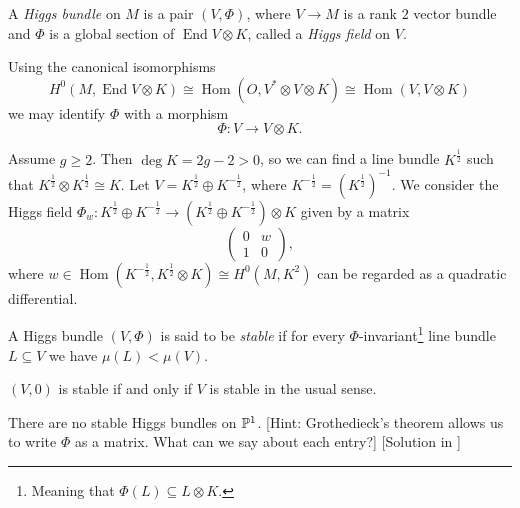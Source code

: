 \documentclass[A4paper, 12pt, british, reqno]{amsart}
\DeclareMathOperator{\Hom}{Hom}
\DeclareMathOperator{\End}{End}
\newcommand{\ot}{\otimes}
\newcommand{\op}{\oplus}
\newcommand{\dual}{^{*}}
\begin{document}
\begin{defn}
    A \textit{Higgs bundle} on $M$ is a pair $(V,\Phi)$, where $V\to M$ is a rank $2$ vector bundle and $\Phi$ is a global section of $\End{V}\ot K$, called a \textit{Higgs field} on $V$.
\end{defn}

\begin{rem}
    Using the canonical isomorphisms
    \[ H^{0}(M,\End{V}\ot K)\cong \Hom(O,V\dual \ot V\ot K)\cong \Hom(V,V\ot K) \]
    we may identify $\Phi$ with a morphism
    \[ \Phi\colon V\to V\ot K. \]
\end{rem}


\begin{exa}
    Assume $g\geqslant 2$.
    Then $\deg{K}=2g-2>0$, so we can find a line bundle $K^{\frac{1}{2}}$ such that $K^{\frac{1}{2}}\ot K^{\frac{1}{2}}\cong K$.
    Let $V=K^{\frac{1}{2}}\op K^{-\frac{1}{2}}$, where $K^{-\frac{1}{2}}=(K^{\frac{1}{2}})^{-1}$.
    We consider the Higgs field $\Phi_{w}\colon K^{\frac{1}{2}}\op K^{-\frac{1}{2}}\to (K^{\frac{1}{2}}\op K^{-\frac{1}{2}})\ot K$ given by a matrix
    \[
	\begin{pmatrix}
	    0 & w \\
	    1 & 0
	\end{pmatrix},
    \]
    where $w\in \Hom(K^{-\frac{1}{2}},K^{\frac{1}{2}}\ot K)\cong H^{0}(M,K^{2})$ can be regarded as a quadratic differential.
\end{exa}

\begin{defn}[Stability]
A Higgs bundle $(V,\Phi)$ is said to be \textit{stable} if for every $\Phi$-invariant\footnote{Meaning that $\Phi(L)\subseteq L\ot K$.} line bundle $L\subseteq V$ we have $\mu(L)<\mu(V)$.
\end{defn}

\begin{rem}
    $(V,0)$ is stable if and only if $V$ is stable in the usual sense.
\end{rem}

\begin{exe}
    There are no stable Higgs bundles on $\P^{1}$.
    [Hint: Grothedieck's theorem allows us to write $\Phi$ as a matrix. What can we say about each entry?]
    [Solution in \cite{hit87a}]
\end{exe}
\end{document}
